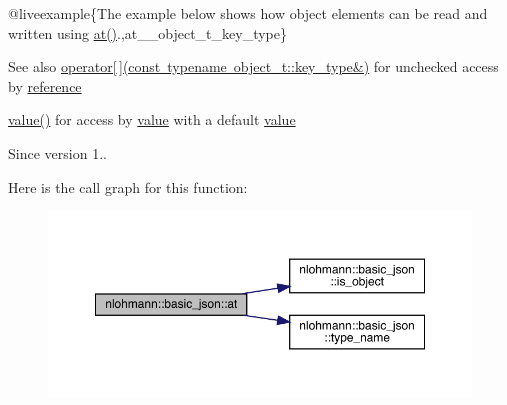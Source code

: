 @liveexample\{The example below shows how object elements can be read and written using {\ttfamily \mbox{\hyperlink{classnlohmann_1_1basic__json_a73ae333487310e3302135189ce8ff5d8}{at()}}}.,at\+\_\+\+\_\+object\+\_\+t\+\_\+key\+\_\+type\}

\begin{DoxySeeAlso}{See also}
\mbox{\hyperlink{classnlohmann_1_1basic__json_a233b02b0839ef798942dd46157cc0fe6}{operator\mbox{[}$\,$\mbox{]}(const typename object\+\_\+t\+::key\+\_\+type\&)}} for unchecked access by \mbox{\hyperlink{classnlohmann_1_1basic__json_ac6a5eddd156c776ac75ff54cfe54a5bc}{reference}} 

\mbox{\hyperlink{classnlohmann_1_1basic__json_af9c51328fbe1da75eca750be3009917a}{value()}} for access by \mbox{\hyperlink{classnlohmann_1_1basic__json_af9c51328fbe1da75eca750be3009917a}{value}} with a default \mbox{\hyperlink{classnlohmann_1_1basic__json_af9c51328fbe1da75eca750be3009917a}{value}}
\end{DoxySeeAlso}
\begin{DoxySince}{Since}
version 1.. 
\end{DoxySince}
Here is the call graph for this function\+:\nopagebreak
\begin{figure}[H]
\begin{center}
\leavevmode
\includegraphics[width=350pt]{classnlohmann_1_1basic__json_a93403e803947b86f4da2d1fb3345cf2c_cgraph}
\end{center}
\end{figure}
\mbox{\label{classnlohmann_1_1basic__json_acac9d438c9bb12740dcdb01069293a34}} 

